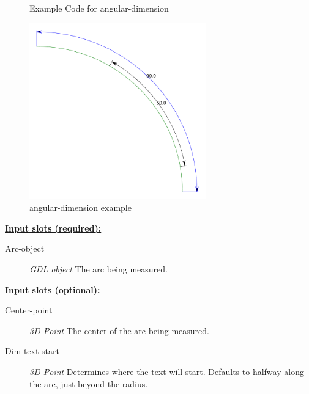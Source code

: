 \documentclass [11pt]{book}
\begin{document}
\begin{itemize}
\begin{figure}
\caption{Example Code for angular-dimension}

\label{fig:example-code-angular-dimension}

\end{figure}

\begin{figure}
\begin{center}
\includegraphics[width=3in,height=3in]{../images/example-angular-dimension.pdf}
\end{center}

\caption{angular-dimension example}

\label{fig:angular-dimension}

\end{figure}





\textbf{
\underline{Input slots (required):}}

\begin{description}

\item [Arc-object]
\emph{GDL object} The arc being measured.


\end{description}






\textbf{
\underline{Input slots (optional):}}

\begin{description}

\item [Center-point]
\emph{3D Point} The center of the arc being measured.


\item [Dim-text-start]
\emph{3D Point} Determines where the text will start. Defaults to halfway along the arc, just beyond the radius.



\end{description}
\end{itemize}
\end{document}
